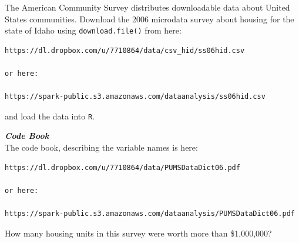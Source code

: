 \documentclass{beamer}
\begin{document}
\begin{frame}[fragile]
The American Community Survey distributes downloadable data about United States communities. 
Download the 2006 microdata survey about housing for the state of Idaho using \texttt{download.file()} from here: 

\begin{verbatim}
https://dl.dropbox.com/u/7710864/data/csv_hid/ss06hid.csv

or here:

https://spark-public.s3.amazonaws.com/dataanalysis/ss06hid.csv 
\end{verbatim}
and load the data into \texttt{R}. 
\end{frame}

\begin{frame}[fragile]
\noindent \textbf{\textit{Code Book}}\\
The code book, describing the variable names is here: 

\begin{verbatim}
https://dl.dropbox.com/u/7710864/data/PUMSDataDict06.pdf

or here: 

https://spark-public.s3.amazonaws.com/dataanalysis/PUMSDataDict06.pdf
\end{verbatim}
\end{frame}
\begin{frame}[fragile]

How many housing units in this survey were worth more than \$1,000,000?

%	

\end{frame}

\end{document}

